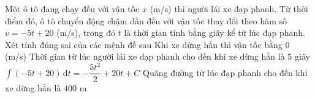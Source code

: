 \begin{ex}%
Một ô tô đang chạy đều với vận tốc $x$ (m/s) thì người lái xe đạp phanh. Từ thời điểm đó, ô tô chuyển động chậm dần đều với vận tốc thay đổi theo hàm số $v=-5t+20$ (m/s), trong đó $t$ là thời gian tính bằng giây kể từ lúc đạp phanh. Xét tính đúng sai của các mệnh đề sau
\choiceTF
{\True Khi xe dừng hẳn thì vận tốc bằng $0$ (m/s)}
{Thời gian từ lúc người lái xe đạp phanh cho đến khi xe dừng hẳn là $5$ giây}
{\True $\displaystyle\int \left(-5t+20\right) \mathrm{\,d}t=-\dfrac{5t^2}{2}+20t+C$}
{Quãng đường từ lúc đạp phanh cho đến khi xe dừng hẳn là $400$ m}
\end{ex}

